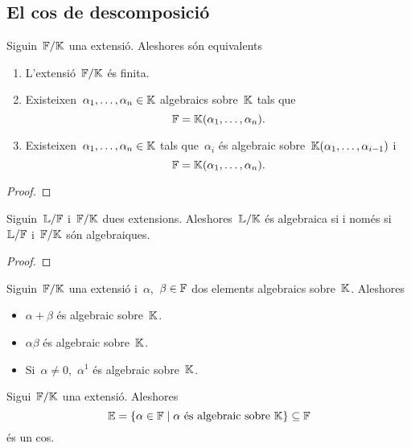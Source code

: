 \documentclass[../Apunts.tex]{subfiles}
\begin{document}
\subsection{El cos de descomposició}
	\begin{lemma}
		\label{lema:condicions equivalents a extensió finita}
		Siguin~\(\mathbb{F}/\mathbb{K}\) una extensió. Aleshores són equivalents
		\begin{enumerate}
		\item L'extensió~\(\mathbb{F}/\mathbb{K}\) és finita.
		\item Existeixen~\(\alpha_{1},\dots,\alpha_{n}\in\mathbb{K}\) algebraics sobre~\(\mathbb{K}\) tals que
		\[\mathbb{F}=\mathbb{K}(\alpha_{1},\dots,\alpha_{n}).\]
		\item Existeixen~\(\alpha_{1},\dots,\alpha_{n}\in\mathbb{K}\) tals que~\(\alpha_{i}\) és algebraic sobre~\(\mathbb{K}(\alpha_{1},\dots,\alpha_{i-1})\) i
		\[\mathbb{F}=\mathbb{K}(\alpha_{1},\dots,\alpha_{n}).\]
		\end{enumerate}
		\begin{proof}
		\end{proof}
	\end{lemma}
	\begin{theorem}
		\label{thm:teorema de les extensions algebraiques}
		Siguin~\(\mathbb{L}/\mathbb{F}\) i~\(\mathbb{F}/\mathbb{K}\) dues extensions. Aleshores~\(\mathbb{L}/\mathbb{K}\) és algebraica
		si i només si~\(\mathbb{L}/\mathbb{F}\) i~\(\mathbb{F}/\mathbb{K}\) són algebraiques.
		\begin{proof}
		\end{proof}
	\end{theorem}
	\begin{theorem}
		\label{thm:els nombres algebraics són un cos}
		Siguin~\(\mathbb{F}/\mathbb{K}\) una extensió i~\(\alpha\),~\(\beta\in\mathbb{F}\) dos elements algebraics sobre~\(\mathbb{K}\). Aleshores
		\begin{itemize}
		\item \(\alpha+\beta\) és algebraic sobre~\(\mathbb{K}\).
		\item \(\alpha\beta\) és algebraic sobre~\(\mathbb{K}\).
		\item Si~\(\alpha\neq0\),~\(\alpha^{1}\) és algebraic sobre~\(\mathbb{K}\).
		\end{itemize}
	\end{theorem}
	\begin{corollary}
		\label{cor:els nombres algebraics són un cos}
		Sigui~\(\mathbb{F}/\mathbb{K}\) una extensió. Aleshores
		\[\mathbb{E}=\{\alpha\in\mathbb{F}\mid\alpha\text{ és algebraic sobre }\mathbb{K}\}\subseteq\mathbb{F}\]
		és un cos.
	\end{corollary}
\end{document}
